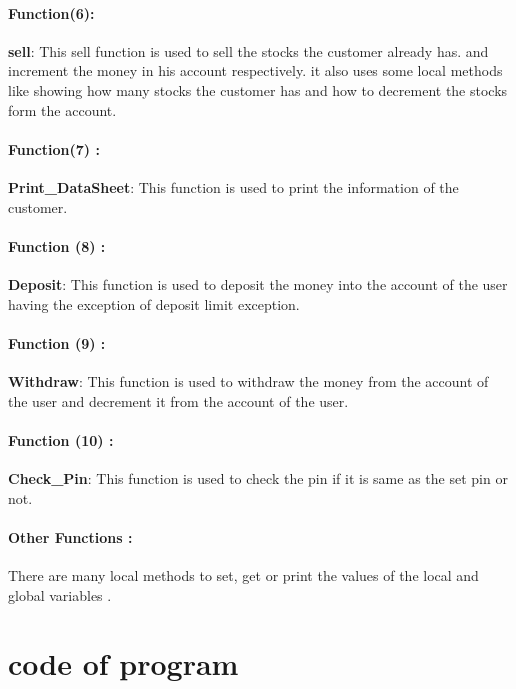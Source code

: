 \documentclass[]{article}
\begin{document}
\paragraph{Function(6): }\textbf{sell}:  This sell function is used to sell the stocks the customer already has. and increment the money in his account respectively. it also uses some local methods like showing how many stocks the customer has and how to decrement the stocks form the account.

\paragraph{Function(7) : }\textbf{Print\_DataSheet}: This function is used to print the information of the customer. 

\paragraph{Function (8) : }\textbf{Deposit}:  This function is used to deposit the money into the account of the user having the exception of deposit limit exception. 

\paragraph{Function (9) : }\textbf{Withdraw}:  This function is used to withdraw the money from the account of the user and decrement it from the account of the user.
\pagebreak

\thispagestyle{others}
\paragraph{Function (10) : }\textbf{Check\_Pin}:  This function is used to check the pin if it is same as the set pin or not. 

\paragraph{Other Functions : } There are many local methods to set, get or print the values of the local and global variables .

\vspace*{1mm}
\section{code of program}
\end{document}
